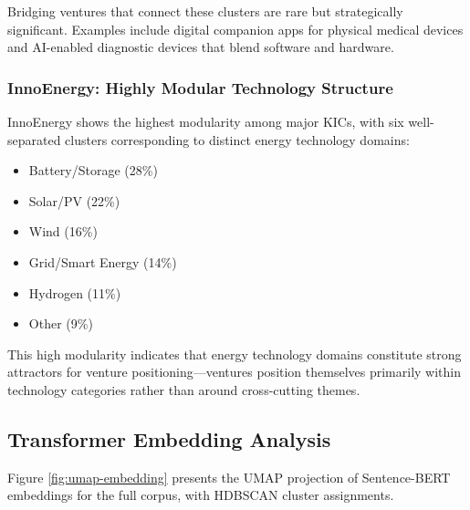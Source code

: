 \documentclass[../main.tex]{subfiles}
\begin{document}
Bridging ventures that connect these clusters are rare but strategically significant. Examples include digital companion apps for physical medical devices and AI-enabled diagnostic devices that blend software and hardware.

\subsubsection{InnoEnergy: Highly Modular Technology Structure}

InnoEnergy shows the highest modularity among major KICs, with six well-separated clusters corresponding to distinct energy technology domains:
\begin{itemize}
    \item Battery/Storage (28\%)
    \item Solar/PV (22\%)
    \item Wind (16\%)
    \item Grid/Smart Energy (14\%)
    \item Hydrogen (11\%)
    \item Other (9\%)
\end{itemize}

This high modularity indicates that energy technology domains constitute strong attractors for venture positioning---ventures position themselves primarily within technology categories rather than around cross-cutting themes.

\subsection{Transformer Embedding Analysis}

Figure \ref{fig:umap-embedding} presents the UMAP projection of Sentence-BERT embeddings for the full corpus, with HDBSCAN cluster assignments.

\begin{center}
\end{center}
\end{document}

